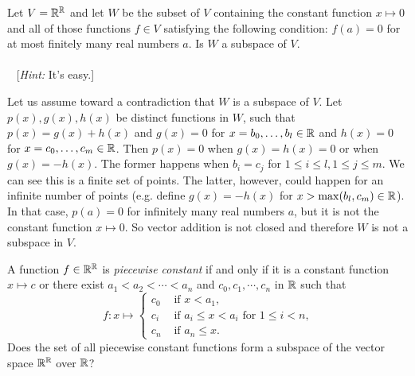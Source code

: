 \begin{problem}[Golan 76]

Let $V = \mathbb{R}^{\mathbb{R}}$ and let $W$ be the subset of $V$ containing the constant
function $x\mapsto 0$ and all of those functions $f \in V$ satisfying the
following condition: $f(a) = 0$ for at most finitely many real numbers $a$.  Is
$W$ a subspace of $V$.\\
\\~
[{\it Hint:} It's easy.]
\end{problem}
\smallskip
\begin{solution}
Let us assume toward a contradiction that $W$ is a subspace of $V$. Let $p(x), g(x), h(x)$ be distinct functions in $W$, such that $p(x) = g(x) + h(x)$ and $g(x) = 0$ for $x = b_0,\dots ,b_l \in \mathbb{R}$ and $h(x) = 0$ for $x = c_0, \dots , c_m \in \mathbb{R}$.  Then $p(x) = 0$ when $g(x) = h(x) = 0$ or when $g(x) = -h(x)$.  The former happens when $b_i = c_j$ for $1 \leq i \leq l, 1 \leq j \leq m$.  We can see this is a finite set of points.  The latter, however, could happen for an infinite number of points (e.g. define $g(x) = -h(x)$ for $x > \max(b_l,c_m) \in \mathbb{R}$). In that case, $p(a) = 0$ for infinitely many real numbers $a$, but it is not the constant function $x \mapsto 0$. So vector addition is not closed and therefore $W$ is not a subspace in $V$.
\end{solution}
\probskip



\begin{ProbBox}  
\begin{problem}[Golan 79]
A function $f \in \mathbb{R}^{\mathbb{R}}$ is \emph{piecewise constant} if and only if it is a
constant function $x \mapsto c$ or there exist 
$a_1 < a_2 < \cdots < a_n$ and 
$c_0, c_1, \cdots, c_n$ in $\mathbb{R}$ such that 
\[
f : x \mapsto 
\begin{cases}
  c_0 & \text{ if $x < a_1$,}\\
  c_i & \text{ if $a_i\leq x < a_i$ for $1\leq i < n$,}\\
  c_n & \text{ if $a_n\leq x$.}
\end{cases}
\]
Does the set of all piecewise constant functions form a subspace of the vector
space $\mathbb{R}^{\mathbb{R}}$ over $\mathbb{R}$?

\end{problem}
\end{ProbBox}  

